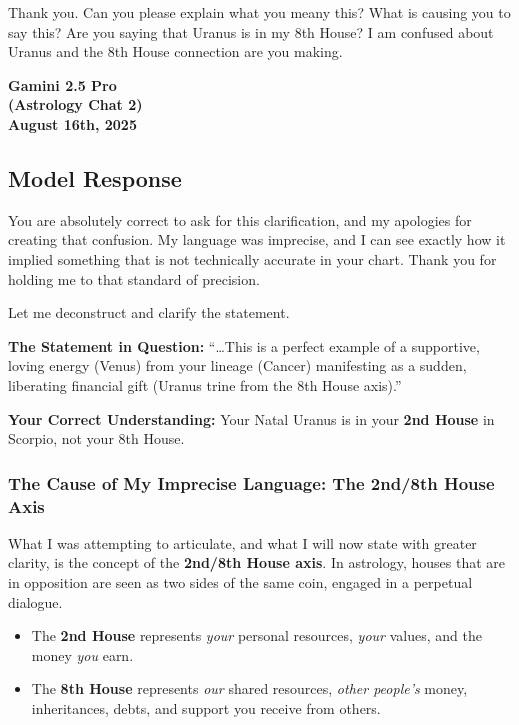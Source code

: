 \documentclass{article}
\begin{document}
Thank you. Can you please explain what you meany this? What is causing you to say this? Are you saying that Uranus is in my 8th House? I am confused about Uranus and the 8th House connection are you making.

\begin{center}
\textbf{Gamini 2.5 Pro} \\
\textbf{(Astrology Chat 2)} \\
\textbf{August 16th, 2025}
\end{center}

\subsection*{Model Response}\label{model-response}

You are absolutely correct to ask for this clarification, and my apologies for creating that confusion. My language was imprecise, and I can see exactly how it implied something that is not technically accurate in your chart. Thank you for holding me to that standard of precision.

Let me deconstruct and clarify the statement.

\textbf{The Statement in Question:} ``\ldots This is a perfect example of a supportive, loving energy (Venus) from your lineage (Cancer) manifesting as a sudden, liberating financial gift (Uranus trine from the 8th House axis).''

\textbf{Your Correct Understanding:} Your Natal Uranus is in your \textbf{2nd House} in Scorpio, not your 8th House.

\subsubsection*{The Cause of My Imprecise Language: The 2nd/8th House Axis}\label{the-cause-of-my-imprecise-language-the-2nd8th-house-axis}

What I was attempting to articulate, and what I will now state with greater clarity, is the concept of the \textbf{2nd/8th House axis}. In astrology, houses that are in opposition are seen as two sides of the same coin, engaged in a perpetual dialogue.

\begin{itemize}
\item
  The \textbf{2nd House} represents \emph{your} personal resources, \emph{your} values, and the money \emph{you} earn.
\item
  The \textbf{8th House} represents \emph{our} shared resources, \emph{other people's} money, inheritances, debts, and support you receive from others.
\end{itemize}
\end{document}
